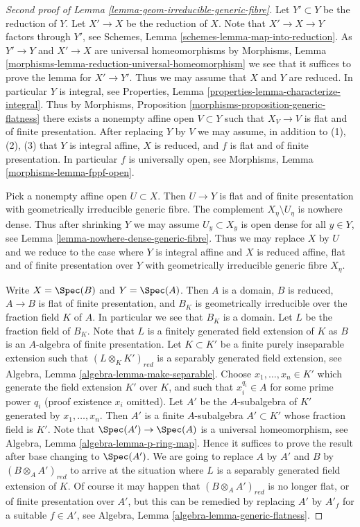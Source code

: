 \begin{proof}[Second proof of Lemma \ref{lemma-geom-irreducible-generic-fibre}]
Let $Y' \subset Y$ be the reduction of $Y$. Let $X' \to X$ be the reduction
of $X$. Note that $X' \to X  \to Y$ factors through $Y'$, see
Schemes, Lemma \ref{schemes-lemma-map-into-reduction}.
As $Y' \to Y$ and $X' \to X$ are universal
homeomorphisms by
Morphisms, Lemma \ref{morphisms-lemma-reduction-universal-homeomorphism}
we see that it suffices to prove the lemma for $X' \to Y'$. Thus
we may assume that $X$ and $Y$ are reduced. In particular $Y$ is integral, see
Properties, Lemma \ref{properties-lemma-characterize-integral}.
Thus by
Morphisms, Proposition \ref{morphisms-proposition-generic-flatness}
there exists a nonempty affine open $V \subset Y$ such that $X_V \to V$ is
flat and of finite presentation. After replacing $Y$ by $V$ we may
assume, in addition to (1), (2), (3) that $Y$ is integral affine, $X$
is reduced, and $f$ is flat and of finite presentation. In particular
$f$ is universally open, see
Morphisms, Lemma \ref{morphisms-lemma-fppf-open}.

\medskip\noindent
Pick a nonempty affine open $U \subset X$. Then $U \to Y$ is flat and of
finite presentation with geometrically irreducible generic fibre.
The complement $X_\eta \setminus U_\eta$ is nowhere dense. Thus after
shrinking $Y$ we may assume $U_y \subset X_y$ is open dense for all
$y \in Y$, see
Lemma \ref{lemma-nowhere-dense-generic-fibre}.
Thus we may replace $X$ by $U$ and we reduce to the
case where $Y$ is integral affine and $X$ is reduced affine, flat and of finite
presentation over $Y$ with geometrically irreducible generic fibre $X_\eta$.

\medskip\noindent
Write $X = \Spec(B)$ and $Y = \Spec(A)$. Then $A$ is a domain,
$B$ is reduced, $A \to B$ is flat of finite presentation, and $B_K$ is
geometrically irreducible over the fraction field $K$ of $A$.
In particular we see that $B_K$ is a domain. Let $L$ be the fraction field
of $B_K$. Note that
$L$ is a finitely generated field extension of $K$ as $B$ is an $A$-algebra
of finite presentation. Let $K \subset K'$ be a finite purely inseparable
extension such that $(L \otimes_K K')_{red}$ is a separably generated field
extension, see
Algebra, Lemma \ref{algebra-lemma-make-separable}.
Choose $x_1, \ldots, x_n \in K'$ which generate the field extension
$K'$ over $K$, and such that $x_i^{q_i} \in A$ for some prime power
$q_i$ (proof existence $x_i$ omitted). Let $A'$ be the $A$-subalgebra
of $K'$ generated by $x_1, \ldots, x_n$. Then $A'$ is a finite
$A$-subalgebra $A' \subset K'$ whose fraction field is $K'$. Note that
$\Spec(A') \to \Spec(A)$ is a universal homeomorphism, see
Algebra, Lemma \ref{algebra-lemma-p-ring-map}.
Hence it suffices to prove the result after base changing to $\Spec(A')$.
We are going to replace $A$ by $A'$ and $B$ by $(B \otimes_A A')_{red}$
to arrive at the situation where $L$ is a separably generated field extension
of $K$. Of course it may happen that $(B \otimes_A A')_{red}$ is no longer
flat, or of finite presentation over $A'$, but this can be remedied by
replacing $A'$ by  $A'_f$ for a suitable $f \in A'$, see
Algebra, Lemma \ref{algebra-lemma-generic-flatness}.


\end{proof}
